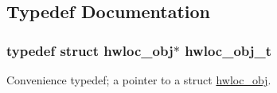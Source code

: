 \subsection{Typedef Documentation}
\hypertarget{a00042_ga79b8ab56877ef99ac59b833203391c7d}{
\subsubsection[{hwloc\_\-obj\_\-t}]{\setlength{\rightskip}{0pt plus 5cm}typedef struct {\bf hwloc\_\-obj}$\ast$ {\bf hwloc\_\-obj\_\-t}}}
\label{a00042_ga79b8ab56877ef99ac59b833203391c7d}


Convenience typedef; a pointer to a struct \hyperlink{a00016}{hwloc\_\-obj}. 

